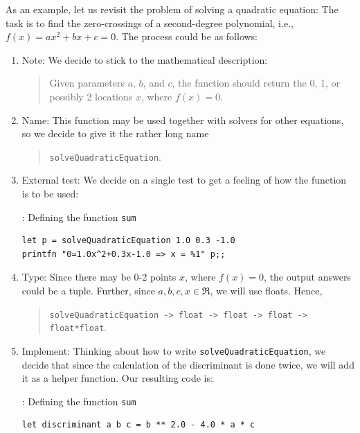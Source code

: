 \documentclass[fsharpNotes.tex]{subfiles}
\begin{document}
As an example, let us revisit the problem of solving a quadratic equation: The task is to find the zero-crossings of a second-degree polynomial, i.e., $f(x)=ax^2+bx+c=0$. The process could be as follows:
\begin{enumerate}
\item Note: We decide to stick to the mathematical description:
  \begin{quote}
    Given parameters $a$, $b$, and $c$, the function should return the 0, 1, or possibly 2 locations $x$, where $f(x)=0$.
  \end{quote}
\item Name: This function may be used together with solvers for other equations, so we decide to give it the rather long name
  \begin{quote}
    \lstinline{solveQuadraticEquation}.
  \end{quote}
\item External test: We decide on a single test to get a feeling of how the function is to be used:
\begin{codeNOutput}[label=solveQuadraticEquationTest1,
  top=-5pt,
  bottom=-5pt,
  left=-2pt,
  right=-2pt,
]{: Defining the function \lstinline{sum}}
\begin{lstlisting}
let p = solveQuadraticEquation 1.0 0.3 -1.0
printfn "0=1.0x^2+0.3x-1.0 => x = %1" p;;
\end{lstlisting} 
\end{codeNOutput}
\item Type: Since there may be 0-2 points $x$, where $f(x)=0$, the output answers could be a tuple. Further, since $a,b,c,x\in\Re$, we will use floats. Hence,
  \begin{quote}
    \lstinline{solveQuadraticEquation -> float -> float -> float -> float*float}.
  \end{quote}
\item Implement: Thinking about how to write  \lstinline{solveQuadraticEquation}, we decide that since the calculation of the discriminant is done twice, we will add it as a helper function. Our resulting code is:
\begin{codeNOutput}[label=solveQuadraticEquationImplementation,
  top=-5pt,
  bottom=-5pt,
  left=-2pt,
  right=-2pt,
]{: Defining the function \lstinline{sum}}
\begin{lstlisting}
let discriminant a b c = b ** 2.0 - 4.0 * a * c


\end{lstlisting}
\end{codeNOutput}
\end{enumerate}
\end{document}

